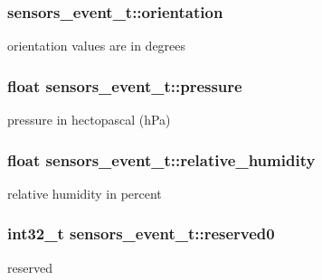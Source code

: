 \subsubsection[{\texorpdfstring{orientation}{orientation}}]{ sensors\+\_\+event\+\_\+t\+::orientation}\hypertarget{structsensors__event__t_acbe3c50a256fa9423bc9e3a6e0da7ebf}{}\label{structsensors__event__t_acbe3c50a256fa9423bc9e3a6e0da7ebf}
orientation values are in degrees 
\subsubsection[{\texorpdfstring{pressure}{pressure}}]{\setlength{\rightskip}{0pt plus 5cm}float sensors\+\_\+event\+\_\+t\+::pressure}\hypertarget{structsensors__event__t_a2ec6e34e1a6cf832d85ca19066bd38f0}{}\label{structsensors__event__t_a2ec6e34e1a6cf832d85ca19066bd38f0}
pressure in hectopascal (h\+Pa) 
\subsubsection[{\texorpdfstring{relative\+\_\+humidity}{relative_humidity}}]{\setlength{\rightskip}{0pt plus 5cm}float sensors\+\_\+event\+\_\+t\+::relative\+\_\+humidity}\hypertarget{structsensors__event__t_a577b73698368fb061382ce9f31052417}{}\label{structsensors__event__t_a577b73698368fb061382ce9f31052417}
relative humidity in percent 
\subsubsection[{\texorpdfstring{reserved0}{reserved0}}]{\setlength{\rightskip}{0pt plus 5cm}int32\+\_\+t sensors\+\_\+event\+\_\+t\+::reserved0}\hypertarget{structsensors__event__t_a8be4dc00344f46abf29e06251bf9fad9}{}\label{structsensors__event__t_a8be4dc00344f46abf29e06251bf9fad9}
reserved 
